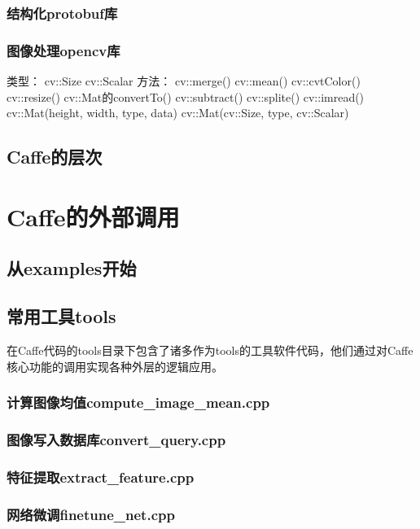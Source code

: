 \documentclass{../CNTeXBookTemplate/NanCNBook}
\begin{document}
\section{结构化protobuf库}

\section{图像处理opencv库}
类型：
cv::Size
cv::Scalar
方法：
cv::merge()
cv::mean()
cv::cvtColor()
cv::resize()
cv::Mat的convertTo()
cv::subtract()
cv::splite()
cv::imread()
cv::Mat(height, width, type, data)
cv::Mat(cv::Size, type, cv::Scalar)
\chapter{Caffe的层次}

\part{Caffe的外部调用}

\chapter{从examples开始} %


\chapter{常用工具tools}
在Caffe代码的tools目录下包含了诸多作为tools的工具软件代码，他们通过对Caffe核心功能的调用实现各种外层的逻辑应用。
\section{计算图像均值compute\_image\_mean.cpp}

\section{图像写入数据库convert\_query.cpp}


                    
\section{特征提取extract\_feature.cpp}

\section{网络微调finetune\_net.cpp}
\end{document}
